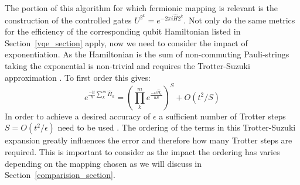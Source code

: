 \documentclass[twoside]{article}
\begin{document}
The portion of this algorithm for which fermionic mapping is relevant is the construction of the controlled gates $U^{2^k} = e^{-2 \pi i \hat H 2^k}$. Not only do the same metrics for the efficiency of the corresponding qubit Hamiltonian listed in Section~\ref{vqe_section} apply, now we need to consider the impact of exponentiation. As the Hamiltonian is the sum of non-commuting Pauli-strings taking the exponential is non-trivial and requires the Trotter-Suzuki approximation \cite{suzuki}. To first order this gives:
\begin{equation}
        e^{\frac{-it}{\hbar} \sum^m_k \hat H_k} = \left( \prod^m_k e^{\frac{-i t \hat H_k}{\hbar S}}\right)^S + O(t^2/S)
\end{equation}
In order to achieve a desired accuracy of $\epsilon$ a sufficient number of Trotter steps $S= O(t^2/ \epsilon)$ need to be used \cite{chemistryReview}. The ordering of the terms in this Trotter-Suzuki expansion greatly influences the error and therefore how many Trotter steps are required. This is important to consider as the impact the ordering has varies depending on the mapping chosen as we will discuss in Section~\ref{comparision_section}.\\\\
\end{document}
